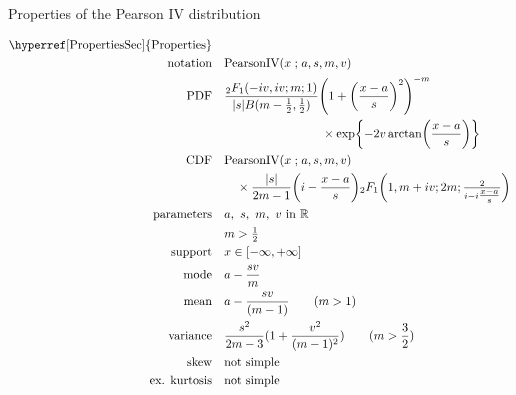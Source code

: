 

\begin{table*}[t!]
 \caption[Pearson  IV distribution -- Properties]{Properties of the Pearson  IV distribution}

\begin{align*}
\text{\hyperref[PropertiesSec]{Properties}}  \quad& \\
\text{notation} \quad & \text{PearsonIV}(x \given a,s, m,v)  
\\
\text{PDF}\quad &    \frac{{}_{2}F_1(-i v, i v ; m;1)  }{|s| B(m-\frac{1}{2}, \frac{1}{2} )} \Left( 1 +\Left( \frac{x-a}{s}\Right)^2 \Right)^{-m}
\\ \notag & \qquad \qquad \qquad \qquad \times \exp \Left\{ - 2 v \arctan \Left( \frac{x-a}{s}\Right) \Right\}
\checked
\\
\text{CDF} \quad  &    \text{PearsonIV}(x\given a,s, m,v)  \\ & \quad  \times \frac{|s|}{2m-1}\Left( i - \frac{x-a}{s}\Right) {}_2F_1\Left(1,m+iv; 2m; \tfrac{2}{i-i\tfrac{x-a}{s}} \Right) \checked
\\
\text{parameters}\quad &   a,\  s,\  m,\ v \text{ in } \Real
\\ & m>\tfrac{1}{2}
\\
\text{support} \quad &   x \in [-\infty, + \infty]
\\
\text{mode} \quad  & a - \frac{sv}{m}  \checked
\\
\text{mean} \quad  &  a - \frac{sv}{(m-1)} \qquad (m>1) \checked
\\
\text{variance} \quad  & \frac{s^2}{2m-3} (1 + \frac{v^2}{(m-1)^2})  \qquad (m>\frac{3}{2}) \checked
\\
\text{skew} \quad  &  \text{not simple}
\\
\text{ex. kurtosis} \quad  &  \text{not simple}
\end{align*}
\end{table*}






